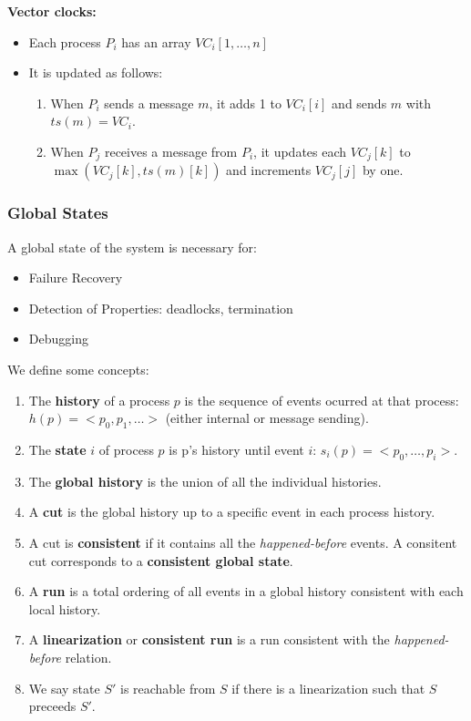 \textbf{Vector clocks:}

\begin{itemize}
    \item Each process $P_i$ has an array $VC_i [ 1, \dots, n ]$
    \item It is updated as follows:
    \begin{enumerate}
        \item When $P_i$ sends a message $m$, it adds 1 to $VC_i[i]$ and sends $m$ with $ts(m) = VC_i$.
        \item When $P_j$ receives a message from $P_i$, it updates each $VC_j[k]$ to $\max(VC_j[k], ts(m)[k])$ and increments $VC_j[j]$ by one.
    \end{enumerate}
\end{itemize}

\subsubsection*{Global States}
A global state of the system is necessary for:
\begin{itemize}
    \item Failure Recovery
    \item Detection of Properties: deadlocks, termination
    \item Debugging
\end{itemize}
We define some concepts:
\begin{enumerate}
    \item The \textbf{history} of a process $p$ is the sequence of events ocurred at that process: $h(p) = <p_0, p_1, \dots>$ (either internal or message sending).
    \item The \textbf{state} $i$ of process $p$ is p's history until event $i$: $s_i(p) = <p_0, \dots, p_i>$.
    \item The \textbf{global history} is the union of all the individual histories.
    \item A \textbf{cut} is the global history up to a specific event in each process history.
    \item A cut is \textbf{consistent} if it contains all the \textit{happened-before} events. A consitent cut corresponds to a \textbf{consistent global state}.
    \item A \textbf{run} is a total ordering of all events in a global history consistent with each local history.
    \item A \textbf{linearization} or \textbf{consistent run} is a run consistent with the \textit{happened-before} relation.
    \item We say state $S'$ is reachable from $S$ if there is a linearization such that $S$ preceeds $S'$.
\end{enumerate}

